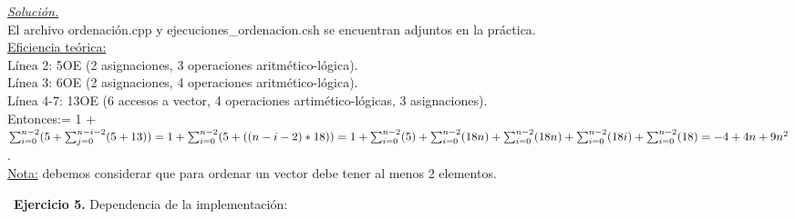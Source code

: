 \documentclass[titlepage, 12pt,a4paper]{article}
\begin{document}
\underline{\emph{Solución.}}\\
El archivo ordenación.cpp y ejecuciones\_ordenacion.csh se encuentran adjuntos en la práctica.\\

\underline{Eficiencia teórica:} \\
	Línea 2: 5OE (2 asignaciones, 3 operaciones aritmético-lógica).\\
	Línea 3: 6OE (2 asignaciones, 4 operaciones aritmético-lógica).\\
	Línea 4-7: 13OE (6 accesos a vector, 4 operaciones artimético-lógicas, 3 asignaciones).\\

Entonces:= 1 + $\sum_{i=0}^{n-2}(5+\sum_{j=0}^{n-i-2}(5+13))= 1 + \sum_{i=0}^{n-2}(5+((n-i-2)*18))= \\
1 + \sum_{i=0}^{n-2}(5) + \sum_{i=0}^{n-2}(18n)+\sum_{i=0}^{n-2}(18n)+ \sum_{i=0}^{n-2}(18i) + \sum_{i=0}^{n-2}(18) = -4 + 4n + 9 n^2$.\\

\small{\underline{Nota:} debemos considerar que para ordenar un vector debe tener al menos 2 elementos.}

\newpage
  
\ 
  \textbf{\large Ejercicio 5.} Dependencia de la implementación:\\ 
  
\end{document}
